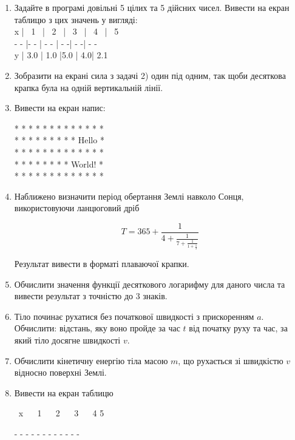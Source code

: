 \documentclass[]{article}
\begin{document}
\begin{enumerate}
\def\labelenumi{\arabic{enumi}.}
\setcounter{enumi}{9}
\item
  Задайте в програмі довільні 5 цілих та 5 дійсних чисел. Вивести на екран таблицю
з цих значень у вигляді:\\

x | \  1 \  | \ 2 \  | \ 3 \ | \ 4 \  | \ 5 \ \\
- - |- - | - - | - -| - -| - - \\
y |  3.0  | 1.0 |5.0 | 4.0| 2.1\\


\item
  Зобразити на екрані сила з задачі 2) один під одним, так щоби десяткова крапка була
на одній вертикальній лінії.

\item
  Вивести на екран напис:

* * * * * * * * * * * * *\\
* * * * * * * * * Hello *\\
* * * * * * * * * * * * *\\ 
* * * * * * * * World!  *\\
* * * * * * * * * * * * *\\

\item
  Наближено визначити період обертання Землі навколо Сонця,
  використовуючи ланцюговий дріб

\[T = 365 + \frac{1}{4 + \frac{1}{7 + \frac{1}{1 + \frac{1}{3}}}}\]

Результат вивести в форматі плаваючої крапки.

\item
  Обчислити значення функції десяткового логарифму для даного числа та
  вивести результат з точністю до 3 знаків.
\item
  Тіло починає рухатися без початкової швидкості з прискоренням
  \(a\). Обчислити: відстань, яку воно пройде за час \(t\) від початку руху та
час, за який тіло досягне швидкості \(v\).

\item
  Обчислити кінетичну енергію тіла масою \(m\), що рухається зі
  швидкістю \(v\) відносно поверхні Землі.
\item
  Вивести на екран таблицю

\ x \ \textbar{} \  1 \ \textbar{} \  2 \ \textbar{} \ 3 \ \textbar{} \ 4 \textbar{} 5 

- - \textbar{} - - \textbar{} - - \textbar{} - - \textbar{} - - \textbar{} - - 


\end{enumerate}
\end{document}
